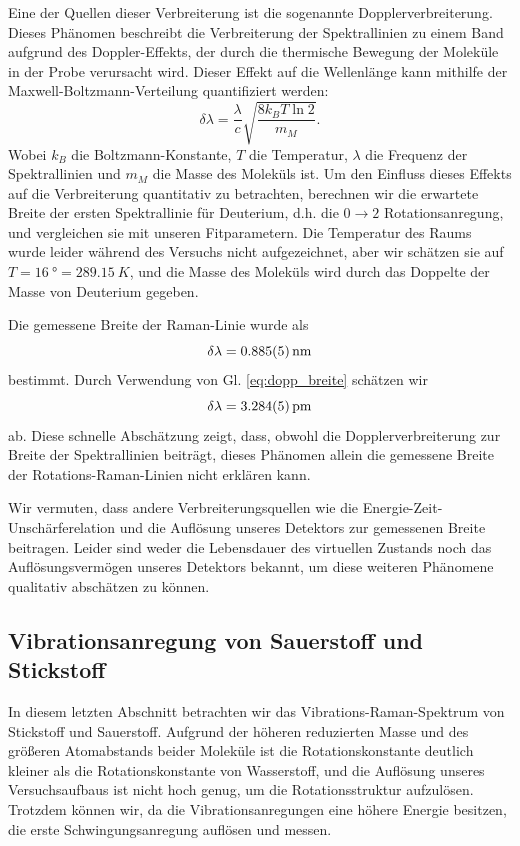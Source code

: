 \documentclass[11pt]{article}
\begin{document}
Eine der Quellen dieser Verbreiterung ist die sogenannte Dopplerverbreiterung. Dieses Phänomen beschreibt die Verbreiterung der Spektrallinien zu einem Band aufgrund des Doppler-Effekts, der durch die thermische Bewegung der Moleküle in der Probe verursacht wird. Dieser Effekt auf die Wellenlänge kann mithilfe der Maxwell-Boltzmann-Verteilung quantifiziert werden:
\begin{equation}
\label{eq:dopp_breite}
\delta \lambda = \dfrac{\lambda}{c} \sqrt{\dfrac{8k_B T \ln 2}{m_{M}}}. 
\end{equation}
Wobei $k_B$ die Boltzmann-Konstante, $T$ die Temperatur, $\lambda$ die Frequenz der Spektrallinien und $m_{M}$ die Masse des Moleküls ist. Um den Einfluss dieses Effekts auf die Verbreiterung quantitativ zu betrachten, berechnen wir die erwartete Breite der ersten Spektrallinie für Deuterium, d.h. die $0\to 2$ Rotationsanregung, und vergleichen sie mit unseren Fitparametern. Die Temperatur des Raums wurde leider während des Versuchs nicht aufgezeichnet, aber wir schätzen sie auf $T = \SI{16}{\degree} = \SI{289.15}{K}$, und die Masse des Moleküls wird durch das Doppelte der Masse von Deuterium gegeben.

Die gemessene Breite der Raman-Linie wurde als
$$\delta \lambda = \SI{0.885 \pm 0.005}{\nano\meter}$$
bestimmt. Durch Verwendung von Gl. \ref{eq:dopp_breite} schätzen wir
$$\delta \lambda =  \SI{3.284\pm 0.005}{\pico\meter}$$
ab. Diese schnelle Abschätzung zeigt, dass, obwohl die Dopplerverbreiterung zur Breite der Spektrallinien beiträgt, dieses Phänomen allein die gemessene Breite der Rotations-Raman-Linien nicht erklären kann.

Wir vermuten, dass andere Verbreiterungsquellen wie die Energie-Zeit-Unschärferelation und die Auflösung unseres Detektors zur gemessenen Breite beitragen. Leider sind weder die Lebensdauer des virtuellen Zustands noch das Auflösungsvermögen unseres Detektors bekannt, um diese weiteren Phänomene qualitativ abschätzen zu können.

\subsection{Vibrationsanregung von Sauerstoff und Stickstoff}
In diesem letzten Abschnitt betrachten wir das Vibrations-Raman-Spektrum von Stickstoff und Sauerstoff. Aufgrund der höheren reduzierten Masse und des größeren Atomabstands beider Moleküle ist die Rotationskonstante deutlich kleiner als die Rotationskonstante von Wasserstoff, und die Auflösung unseres Versuchsaufbaus ist nicht hoch genug, um die Rotationsstruktur aufzulösen. Trotzdem können wir, da die Vibrationsanregungen eine höhere Energie besitzen, die erste Schwingungsanregung auflösen und messen.
\end{document}
